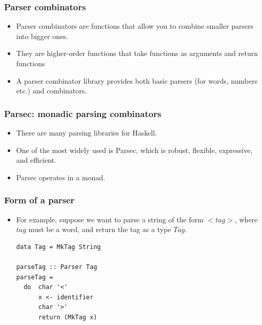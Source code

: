 \documentclass{beamer}
\begin{document}
\begin{frame}[fragile]
\frametitle{Parser combinators}

\begin{itemize}
\item Parser combinators are functions that allow you to combine smaller parsers into bigger ones.
\item They are higher-order functions that take functions as arguments and return functions
\item A parser combinator library provides both basic parsers (for words, numbers etc.) and combinators.
\end{itemize}

\end{frame}
\begin{frame}[fragile]
\frametitle{Parsec: monadic parsing combinators}

\begin{itemize}
\item There are many parsing libraries for Haskell.
\item One of the most widely used is Parsec, which is robust,
  flexible, expressive, and efficient.
\item Parsec operates in a monad.
\end{itemize}

\end{frame}

\begin{frame}[fragile]
\frametitle{Form of a parser}

\begin{itemize}
\item For example, suppose we want to  parse a string of the form $<tag>$, where
  $tag$ must be a word, and return the tag as a type $Tag$.


\begin{verbatim}
data Tag = MkTag String

parseTag :: Parser Tag
parseTag =
  do  char '<'
      x <- identifier
      char '>'
      return (MkTag x)
\end{verbatim}

\end{itemize}

\end{frame}
\end{document}
